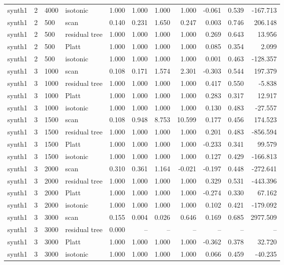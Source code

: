 \begin{tabular}{lrllrrrrrrr}
synth1 & 2 & 4000 & isotonic & 1.000 & 1.000 & 1.000 & 1.000 & -0.061 & 0.539 & -167.713 \\
synth1 & 2 & 500 & scan & 0.140 & 0.231 & 1.650 & 0.247 & 0.003 & 0.746 & 206.148 \\
synth1 & 2 & 500 & residual tree & 1.000 & 1.000 & 1.000 & 1.000 & 0.269 & 0.643 & 13.956 \\
synth1 & 2 & 500 & Platt & 1.000 & 1.000 & 1.000 & 1.000 & 0.085 & 0.354 & 2.099 \\
synth1 & 2 & 500 & isotonic & 1.000 & 1.000 & 1.000 & 1.000 & 0.001 & 0.463 & -128.357 \\
synth1 & 3 & 1000 & scan & 0.108 & 0.171 & 1.574 & 2.301 & -0.303 & 0.544 & 197.379 \\
synth1 & 3 & 1000 & residual tree & 1.000 & 1.000 & 1.000 & 1.000 & 0.417 & 0.550 & -5.838 \\
synth1 & 3 & 1000 & Platt & 1.000 & 1.000 & 1.000 & 1.000 & 0.283 & 0.317 & 12.917 \\
synth1 & 3 & 1000 & isotonic & 1.000 & 1.000 & 1.000 & 1.000 & 0.130 & 0.483 & -27.557 \\
synth1 & 3 & 1500 & scan & 0.108 & 0.948 & 8.753 & 10.599 & 0.177 & 0.456 & 174.523 \\
synth1 & 3 & 1500 & residual tree & 1.000 & 1.000 & 1.000 & 1.000 & 0.201 & 0.483 & -856.594 \\
synth1 & 3 & 1500 & Platt & 1.000 & 1.000 & 1.000 & 1.000 & -0.233 & 0.341 & 99.579 \\
synth1 & 3 & 1500 & isotonic & 1.000 & 1.000 & 1.000 & 1.000 & 0.127 & 0.429 & -166.813 \\
synth1 & 3 & 2000 & scan & 0.310 & 0.361 & 1.164 & -0.021 & -0.197 & 0.448 & -272.641 \\
synth1 & 3 & 2000 & residual tree & 1.000 & 1.000 & 1.000 & 1.000 & 0.329 & 0.531 & -443.396 \\
synth1 & 3 & 2000 & Platt & 1.000 & 1.000 & 1.000 & 1.000 & -0.274 & 0.330 & 67.162 \\
synth1 & 3 & 2000 & isotonic & 1.000 & 1.000 & 1.000 & 1.000 & 0.102 & 0.421 & -179.092 \\
synth1 & 3 & 3000 & scan & 0.155 & 0.004 & 0.026 & 0.646 & 0.169 & 0.685 & 2977.509 \\
synth1 & 3 & 3000 & residual tree & 0.000 & -- & -- & -- & -- & -- & -- \\
synth1 & 3 & 3000 & Platt & 1.000 & 1.000 & 1.000 & 1.000 & -0.362 & 0.378 & 32.720 \\
synth1 & 3 & 3000 & isotonic & 1.000 & 1.000 & 1.000 & 1.000 & 0.066 & 0.459 & -40.235 \\

\end{tabular}
